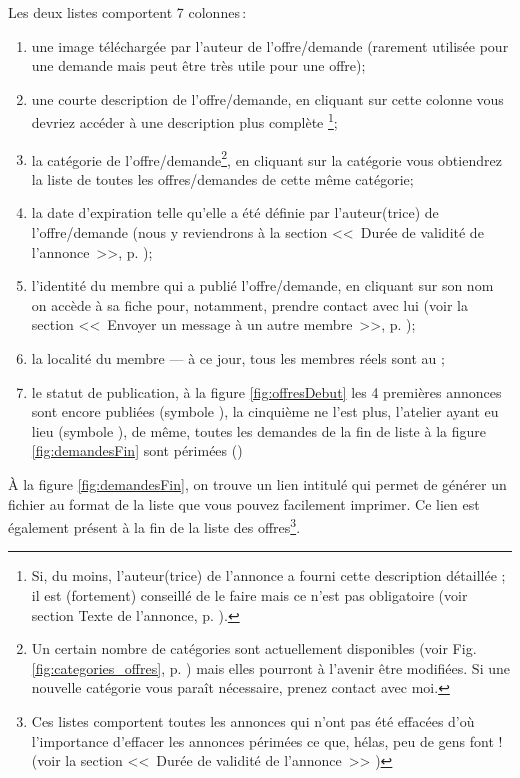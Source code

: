 Les deux listes comportent 7 colonnes\,:
\begin{enumerate}
    \item une image téléchargée par l’auteur de l’offre/demande (rarement utilisée pour une demande mais peut être très utile pour une offre);
    \item une courte description de l'offre/demande, en cliquant sur cette colonne vous devriez accéder à une description plus complète%
    \footnote{Si, du moins, l'auteur(trice) de l'annonce a fourni cette description détaillée ; il est (fortement) conseillé de le faire mais ce n'est pas obligatoire (voir section \og{}Texte de l'annonce\fg, p. \pageref{sec:texteAnnonce}).};
    \item la catégorie de l'offre/demande\footnote{Un certain nombre de catégories sont actuellement disponibles (voir Fig. \ref{fig:categories_offres}, p. \pageref{fig:categories_offres}) mais elles pourront à l’avenir être modifiées. Si une nouvelle catégorie vous paraît nécessaire, prenez contact avec moi.}, en cliquant sur la catégorie vous obtiendrez la liste de toutes les offres/demandes de cette même catégorie;
    \item la date d’expiration telle qu’elle a été définie par l’auteur(trice) de l’offre/demande (nous y reviendrons à la section <<~Durée de validité de l’annonce~>>, p. \pageref{sec:dureeValiditeAnnonce});
    \item l’identité du membre qui a publié l’offre/demande, en cliquant sur son nom on accède à sa fiche pour, notamment, prendre contact avec lui (voir la section <<~Envoyer un message à un autre membre~>>, p. \pageref{page:envoyerCourrielMembre});
    \item la localité du membre --- à ce jour, tous les membres réels sont au \CdS;
    \item le statut de publication, à la figure \ref{fig:offresDebut} les 4 premières annonces sont encore publiées (symbole ), la cinquième ne l’est plus, l’atelier ayant eu lieu (symbole ), de même, toutes les demandes de la fin de liste à la figure \ref{fig:demandesFin} sont périmées ()
\end{enumerate}

À la figure \ref{fig:demandesFin}, on trouve un lien intitulé  qui permet de générer un fichier au format  de la liste que vous pouvez facilement imprimer. Ce lien est également présent à la fin de la liste des offres\footnote{Ces listes comportent toutes les annonces qui n'ont pas été effacées d'où l'importance d'effacer les annonces périmées ce que, hélas, peu de gens font ! (voir la section <<~Durée de validité de l'annonce~>> )}.

